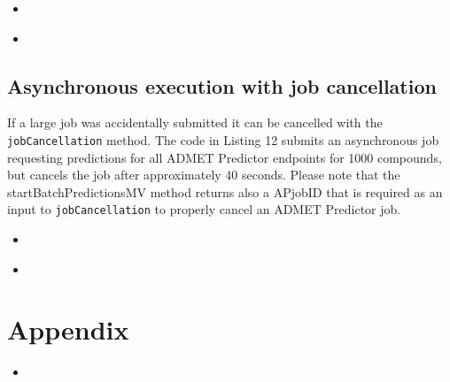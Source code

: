 \documentclass{article}
\newcommand{\insertcode}[2]{\begin{itemize}\item[]\end{itemize}} %
\begin{document}
\insertcode{"Scripts/testAsyncBatchPredictionMV.py"}{Calling the asynchronous batch method to obtain predictions from MV numbers.} %
\insertcode{"Scripts/testAsyncBatchPredictionMV.txt"}{Output of the asynchronous execution.} %

\subsection{Asynchronous execution with job cancellation}
If a large job was accidentally submitted it can be cancelled with the \texttt{jobCancellation} method. 
The code in Listing 12 submits an asynchronous job requesting predictions 
for all ADMET Predictor endpoints for 1000 compounds, but cancels the job after approximately 40 
seconds. Please note that the startBatchPredictionsMV method returns also a APjobID that is required 
as an input to \texttt{jobCancellation} to properly cancel an ADMET Predictor job. 

\insertcode{"Scripts/testAsyncBatchPredictionMVCancellation.py"}{Calling the asynchronous batch method and cancelling the job after 40 seconds.} %
\insertcode{"Scripts/testAsyncBatchPredictionMVCancellation.txt"}{Output of the asynchronous execution with job cancellation.} %

\section{Appendix}
\insertcode{"Scripts/D360endpoints.txt"}{Output of the D360endpoints method.} %
\end{document}
